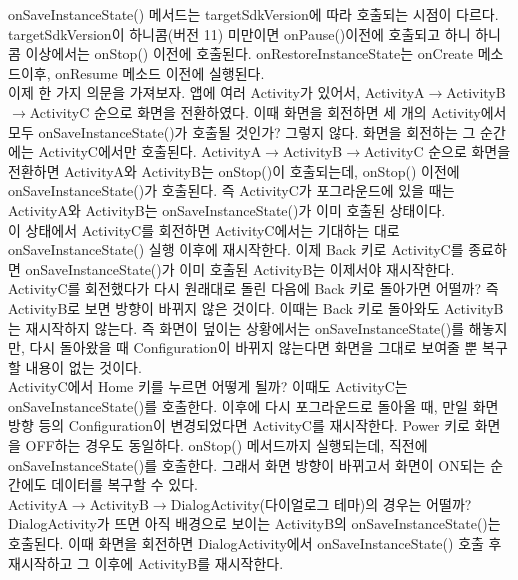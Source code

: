 onSaveInstanceState() 메서드는 targetSdkVersion에 따라 호출되는 시점이 다르다. targetSdkVersion이 하니콤(버전 11) 미만이면 onPause()이전에 호출되고 하니 하니콤 이상에서는 onStop() 이전에 호출된다.
onRestoreInstanceState는 onCreate 메소드이후, onResume 메소드 이전에 실행된다.\\

이제 한 가지 의문을 가져보자.
앱에 여러 Activity가 있어서, ActivityA$\rightarrow$ActivityB$\rightarrow$ActivityC 순으로 화면을 전환하였다. 
이때 화면을 회전하면 세 개의 Activity에서 모두 onSaveInstanceState()가 호출될 것인가? 그렇지 않다. 화면을 회전하는 그 순간에는 ActivityC에서만 호출된다.
ActivityA$\rightarrow$ActivityB$\rightarrow$ActivityC 순으로 화면을 전환하면 ActivityA와 ActivityB는 onStop()이 호출되는데, onStop() 이전에 onSaveInstanceState()가 호출된다.
즉 ActivityC가 포그라운드에 있을 때는 ActivityA와 ActivityB는 onSaveInstanceState()가 이미 호출된 상태이다.\\

이 상태에서 ActivityC를 회전하면 ActivityC에서는 기대하는 대로 onSaveInstanceState() 실행 이후에 재시작한다.
이제 Back 키로 ActivityC를 종료하면 onSaveInstanceState()가 이미 호출된 ActivityB는 이제서야 재시작한다.
ActivityC를 회전했다가 다시 원래대로 돌린 다음에 Back 키로 돌아가면 어떨까? 즉 ActivityB로 보면 방향이 바뀌지 않은 것이다.
이때는 Back 키로 돌아와도 ActivityB는 재시작하지 않는다. 즉 화면이 덮이는 상황에서는 onSaveInstanceState()를 해놓지만, 다시 돌아왔을 때 Configuration이 바뀌지 않는다면 화면을 그대로 보여줄 뿐 복구할 내용이 없는 것이다.\\

ActivityC에서 Home 키를 누르면 어떻게 될까? 이때도 ActivityC는 onSaveInstanceState()를 호출한다.
이후에 다시 포그라운드로 돌아올 때, 만일 화면 방향 등의 Configuration이 변경되었다면 ActivityC를 재시작한다. 
Power 키로 화면을 OFF하는 경우도 동일하다. onStop() 메서드까지 실행되는데, 직전에 onSaveInstanceState()를 호출한다. 
그래서 화면 방향이 바뀌고서 화면이 ON되는 순간에도 데이터를 복구할 수 있다.\\

ActivityA$\rightarrow$ActivityB$\rightarrow$DialogActivity(다이얼로그 테마)의 경우는 어떨까?
DialogActivity가 뜨면 아직 배경으로 보이는 ActivityB의 onSaveInstanceState()는 호출된다.
이때 화면을 회전하면 DialogActivity에서 onSaveInstanceState() 호출 후 재시작하고 그 이후에 ActivityB를 재시작한다.

